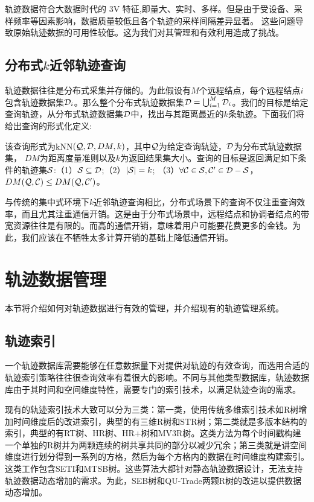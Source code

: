 轨迹数据符合大数据时代的 3V 特征,即量大、实时、多样。但是由于受设备、采样频率等因素影响，数据质量较低且各个轨迹的采样间隔差异显著。
这些问题导致原始轨迹数据的可用性较低。这为我们对其管理和有效利用造成了挑战。

\subsection{分布式$k$近邻轨迹查询}
轨迹数据往往是分布式采集并存储的。为此假设有$M$个远程结点，每个远程结点$i$包含轨迹数据集${\cal D}_{i}$。那么整个分布式轨迹数据集${\cal D}=\bigcup_{i=1}^{M} {\cal D}_{i}$。我们的目标是给定查询轨迹，从分布式轨迹数据集${\cal D}$中，找出与其距离最近的$k$条轨迹。下面我们将给出查询的形式化定义:
\begin{define}[分布式k近邻轨迹查询]
	该查询形式为kNN$({\cal Q}, {\cal D},DM,k)$，其中$\cal Q$为给定查询轨迹，${\cal D}$为分布式轨迹数据集， $DM$为距离度量准则以及$k$为返回结果集大小。查询的目标是返回满足如下条件的轨迹集$\cal S$:（1）${\cal S} \subseteq {\cal D}$;（2）$| {\cal S}|=k$;
	（3）$\forall {\cal C} \in {\cal S}, {\cal C}' \in {{\cal D} - \cal S}$，$DM({\cal Q},{\cal C}) \le DM({\cal Q},{\cal C}')$。
\end{define}

与传统的集中式环境下$k$近邻轨迹查询相比，分布式场景下的查询不仅注重查询效率，而且尤其注重通信开销。这是由于分布式场景中，远程结点和协调者结点的带宽资源往往是有限的。而高的通信开销，意味着用户可能要花费更多的金钱。为此，我们应该在不牺牲太多计算开销的基础上降低通信开销。

\section{轨迹数据管理}
本节将介绍如何对轨迹数据进行有效的管理，并介绍现有的轨迹管理系统。

\subsection{轨迹索引}
一个轨迹数据库需要能够在任意数据量下对提供对轨迹的有效查询，而选用合适的轨迹索引策略往往很查询效率有着很大的影响。不同与其他类型数据库，轨迹数据库由于其时间和空间维度特性，需要专门的索引技术，以满足轨迹查询的需求。

现有的轨迹索引技术大致可以分为三类：第一类，使用传统多维索引技术如R树增加时间维度后的改进索引，典型的有三维R树和STR树\cite{PfoserJT00}；第二类就是多版本结构的索引，典型的有RT树\cite{Xu1990Rt}、HR树\cite{NascimentoS98}、HR+树\cite{TaoP01}和MV3R树\cite{PapadiasT01}。这类方法为每个时间戳构建一个单独的R树并为两颗连续的树共享共同的部分以减少冗余；第三类就是讲空间维度进行划分得到一系列的方格，然后为每个方格内的数据在时间维度构建索引。这类工作包含SETI\cite{ChakkaEP03}和MTSB树\cite{ZhouZSCK05}。这些算法大都针对静态轨迹数据设计，无法支持轨迹数据动态增加的需求。为此，SEB树\cite{SongR03}和QU-Trade两颗R树的改进以提供数据动态增加。


